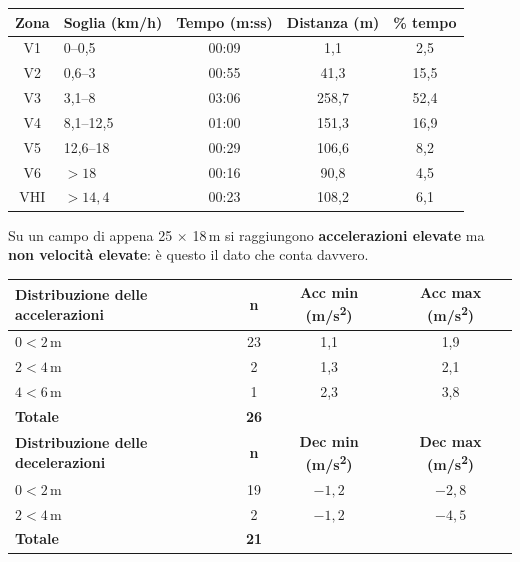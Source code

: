 \begin{table}[htbp]
  \centering
  \small
  \renewcommand{\arraystretch}{1.3}
  \begin{tabularx}{\textwidth}{|c|X|c|c|c|}
    \hline
    \textbf{Zona} & \textbf{Soglia (km/h)} & \textbf{Tempo (m:ss)} & \textbf{Distanza (m)} & \textbf{\% tempo} \\
    \hline
    V1 & 0--0,5 & 00:09 & 1,1 & 2,5 \\
    \hline
    V2 & 0,6--3 & 00:55 & 41,3 & 15,5 \\
    \hline
    V3 & 3,1--8 & 03:06 & 258,7 & 52,4 \\
    \hline
    V4 & 8,1--12,5 & 01:00 & 151,3 & 16,9 \\
    \hline
    V5 & 12,6--18 & 00:29 & 106,6 & 8,2 \\
    \hline
    V6 & $> 18$ & 00:16 & 90,8 & 4,5 \\
    \hline
    VHI & $> 14,4$ & 00:23 & 108,2 & 6,1 \\
    \hline
  \end{tabularx}
\end{table}

Su un campo di appena 25 $\times$ 18\,m si raggiungono \textbf{accelerazioni elevate} ma \textbf{non
velocità elevate}: è questo il dato che conta davvero.

\begin{table}[htbp]
  \centering
  \small
  \renewcommand{\arraystretch}{1.3}
  \begin{tabularx}{\textwidth}{|X|c|c|c|}
    \hline
    \textbf{Distribuzione delle accelerazioni} & \textbf{n} & \textbf{Acc min (m/s\textsuperscript{2})} & \textbf{Acc max (m/s\textsuperscript{2})} \\
    \hline
    $0 < 2$\,m & 23 & 1,1 & 1,9 \\
    \hline
    $2 < 4$\,m & 2 & 1,3 & 2,1 \\
    \hline
    $4 < 6$\,m & 1 & 2,3 & 3,8 \\
    \hline
    \textbf{Totale} & \textbf{26} & & \\
    \hline
    \textbf{Distribuzione delle decelerazioni} & \textbf{n} & \textbf{Dec min (m/s\textsuperscript{2})} & \textbf{Dec max (m/s\textsuperscript{2})} \\
    \hline
    $0 < 2$\,m & 19 & $-1,2$ & $-2,8$ \\
    \hline
    $2 < 4$\,m & 2 & $-1,2$ & $-4,5$ \\
    \hline
    \textbf{Totale} & \textbf{21} & & \\
    \hline
  \end{tabularx}
\end{table}

